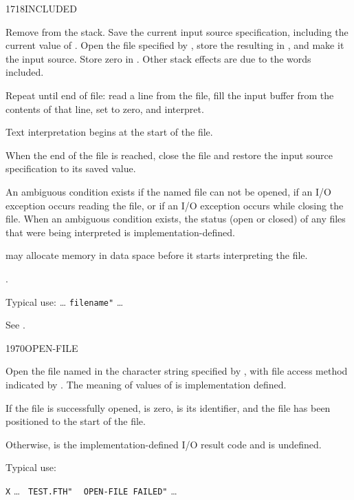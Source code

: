 \begin{worddef}{1718}{INCLUDED}
\item {}

	Remove  from the stack. Save the current input
	source specification, including the current value of
	. Open the file specified by ,
	store the resulting  in , and make
	it the input source. Store zero in . Other
	stack effects are due to the words included.

	Repeat until end of file: read a line from the file, fill the
	input buffer from the contents of that line, set 
	to zero, and interpret.

	Text interpretation begins at the start of the file.

	When the end of the file is reached, close the file and restore
	the input source specification to its saved value.

	An ambiguous condition exists if the named file can not be
	opened, if an I/O exception occurs reading the file, or if an
	I/O exception occurs while closing the file. When an ambiguous
	condition exists, the status (open or closed) of any files that
	were being interpreted is implementation-defined.

	 may allocate memory in data space before it
	starts interpreting the file.

\see {}.

	\begin{defer}
	\rationale %
		Typical use:
			{\ldots}  \texttt{filename"}  {\ldots}

	\testing*
		See .
	\end{defer}
\end{worddef}


\begin{worddef}{1970}{OPEN-FILE}
\item {}

	Open the file named in the character string specified by
	, with file access method indicated by
	. The meaning of values of  is
	implementation 	defined.

	If the file is successfully opened,  is zero,
	 is its identifier, and the file has been
	positioned to the start of the file.

	Otherwise,  is the implementation-defined I/O
	result code and  is undefined.

	\begin{defer}
	\rationale %
		Typical use:

		\tab \word[core]{:} \texttt{X} {\ldots}
				 \texttt{ TEST.FTH"} \word{R/W}
				~  \texttt{OPEN-FILE FAILED"}
			{\ldots} \word[core]{;}
	\end{defer}
\end{worddef}


